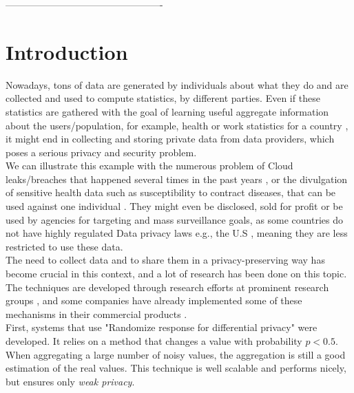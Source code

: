 \documentclass{article}
\begin{document}
-------------------------------------------------

\newpage
\tableofcontents
\newpage



\section*{Introduction}
Nowadays, tons of data are generated by individuals about what they do and are collected and used to compute statistics, by different parties. Even if these statistics are gathered with the goal of learning useful aggregate information about the users/population, for example, health or work statistics for a country \cite{swiss}, it might end in collecting and storing private data from data providers, which poses a serious privacy and security problem.\\
We can illustrate this example with the numerous problem of Cloud leaks/breaches that happened several times in the past years \cite{pentagon}, or the divulgation of sensitive health data such as susceptibility to contract diseases, that can be used against one individual \cite{sell}. They might even be disclosed, sold for profit \cite{sold} or be used by agencies for targeting and mass surveillance goals, as some countries do not have highly regulated Data privacy laws e.g., the U.S \cite{law}, meaning they are less restricted to use these data.\\
The need to collect data and to share them in a privacy-preserving way has become crucial in this context, and a lot of research has been done on this topic.\\
The techniques are developed through research efforts at prominent research groups \cite{unlynx,prio}, and some companies have already implemented some of these mechanisms in their commercial products \cite{apple}.\\
First, systems that use "Randomize response for differential privacy" \cite{randomized} were developed. It relies on a method that changes a value with probability $p < 0.5$.
When aggregating a large number of noisy values, the aggregation is still a good estimation of the real values. This technique is well scalable and performs nicely, but ensures only \textit{weak privacy}.\\
\end{document}
